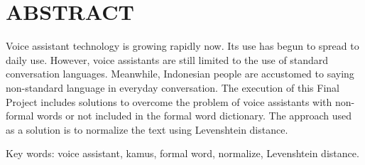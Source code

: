 \clearpage
\chapter*{ABSTRACT}

Voice assistant technology is growing rapidly now. Its use has begun to spread to daily use. However, voice assistants are still limited to the use of standard conversation languages. Meanwhile, Indonesian people are accustomed to saying non-standard language in everyday conversation. The execution of this Final Project includes solutions to overcome the problem of voice assistants with non-formal words or not included in the formal word dictionary. The approach used as a solution is to normalize the text using Levenshtein distance.

\vspace{15mm}
Key words: voice assistant, kamus, formal word, normalize, Levenshtein distance.

\clearpage